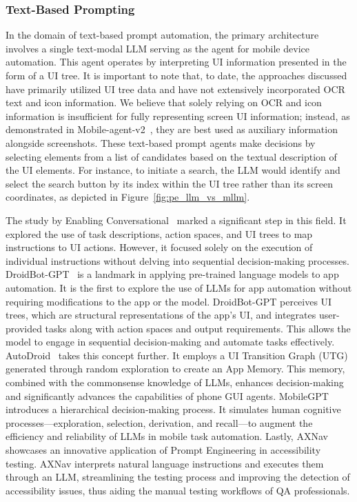 \subsubsection{Text-Based Prompting}
\label{subsubsec: Text-Based Prompt}

In the domain of text-based prompt automation, the primary architecture involves a single text-modal LLM serving as the agent for mobile device automation. This agent operates by interpreting UI information presented in the form of a UI tree. It is important to note that, to date, the approaches discussed have primarily utilized UI tree data and have not extensively incorporated OCR text and icon information. We believe that solely relying on OCR and icon information is insufficient for fully representing screen UI information; instead, as demonstrated in Mobile-agent-v2~\cite{wang2024mobileagentv2}, they are best used as auxiliary information alongside screenshots. These text-based prompt agents make decisions by selecting elements from a list of candidates based on the textual description of the UI elements. For instance, to initiate a search, the LLM would identify and select the search button by its index within the UI tree rather than its screen coordinates, as depicted in Figure~\ref{fig:pe_llm_vs_mllm}.

The study by Enabling Conversational~\cite{wang2023enabling} marked a significant step in this field. It explored the use of task descriptions, action spaces, and UI trees to map instructions to UI actions. However, it focused solely on the execution of individual instructions without delving into sequential decision-making processes.
DroidBot-GPT~\cite{wen2023droidbot} is a landmark in applying pre-trained language models to app automation. It is the first to explore the use of LLMs for app automation without requiring modifications to the app or the model. DroidBot-GPT perceives UI trees, which are structural representations of the app's UI, and integrates user-provided tasks along with action spaces and output requirements. This allows the model to engage in sequential decision-making and automate tasks effectively. 
AutoDroid~\cite{wen2024autodroid} takes this concept further. It employs a UI Transition Graph (UTG) generated through random exploration to create an App Memory. This memory, combined with the commonsense knowledge of LLMs, enhances decision-making and significantly advances the capabilities of phone GUI agents.
MobileGPT~\cite{lee2023exploremobilegpt} introduces a hierarchical decision-making process. It simulates human cognitive processes—exploration, selection, derivation, and recall—to augment the efficiency and reliability of LLMs in mobile task automation.
Lastly, AXNav~\cite{taeb2024axnav} showcases an innovative application of Prompt Engineering in accessibility testing. AXNav interprets natural language instructions and executes them through an LLM, streamlining the testing process and improving the detection of accessibility issues, thus aiding the manual testing workflows of QA professionals.

